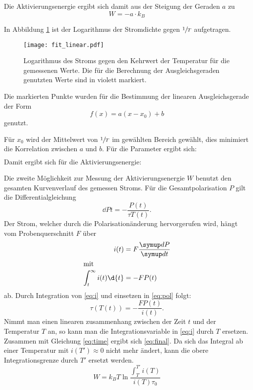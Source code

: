 Die Aktivierungsenergie ergibt sich damit aus der Steigung der Geraden $a$ zu
\begin{equation}
  W = - a \cdot k_B
\end{equation}

In Abbildung \ref{fig:lnj} ist der Logarithmus der Stromdichte gegen $\sfrac{1}{T}$ aufgetragen.

\begin{figure}
  \texttt{[image: fit\_linear.pdf]}
  \caption{%
    Logarithmus des Stroms gegen den Kehrwert der Temperatur für die gemessenen Werte.
    Die für die Berechnung der Ausgleichsgeraden genutzten Werte sind in violett markiert.
  }
  \label{fig:lnj}
\end{figure}

Die markierten Punkte wurden für die Bestimmung der linearen Ausgleichsgerade der Form
\begin{equation}
  f(x) = a (x - x_0) + b
\end{equation}
genutzt.

Für $x_0$ wird der Mittelwert von $\sfrac{1}{T}$ im gewählten Bereich gewählt, dies minimiert die Korrelation zwischen $a$ und $b$.
Für die Parameter ergibt sich:
\begin{align}
  
\end{align}
Damit ergibt sich für die Aktivierungsenergie:
\begin{equation}
  
\end{equation}

Die zweite Möglichkeit zur Messung der Aktivierungsenergie $W$ benutzt den gesamten Kurvenverlauf des gemessen Stroms.
Für die Gesamtpolarisation $P$ gilt die Differentialgleichung
\begin{equation}
  \dd{P}{t} = - \frac{P(t)}{\tau{T(t)}}.
  \label{eq:pol}
\end{equation}
Der Strom, welcher durch die Polarisationänderung hervorgerufen wird, hängt vom Probenquerschnitt $F$ über
\begin{align}
  i(t) &= F \dd{P}{t} \\
  \shortintertext{mit}
  \int_t^{\infty} i(t) \d{t} &= -FP(t)
  \label{eq:i}
\end{align}
ab.
Durch Integration von  \eqref{eq:i} und einsetzen in \eqref{eq:pol} folgt:
\begin{equation}
  \tau(T(t)) = -\frac{F P(t)}{i(t)}.
  \label{eq:tau_t}
\end{equation}
Nimmt man einen linearen zusammenhang zwischen der Zeit $t$ und der Temperatur $T$ an, so kann man die Integrationsvariable in \eqref{eq:i} durch $T$ ersetzen.
Zusammen mit Gleichung \eqref{eq:time} ergibt sich \eqref{eq:final}. Da sich das Integral ab einer Temperatur mit $i(T') \approx 0$ nicht mehr ändert,
kann die obere Integrationsgrenze durch $T'$ ersetzt werden.
\begin{equation}
  W = k_B T \ln \frac{\int_T^{T'} i(T)}{ i(T) \tau_0}
  \label{eq:final}
\end{equation}

